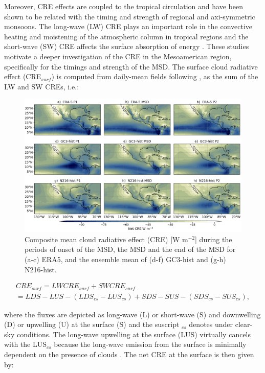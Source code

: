 Moreover,  CRE effects are coupled to the tropical circulation \citep{bony2004dynamic,webb2017} and have been shown to be related with the timing and strength of regional \citep{guo2015} and axi-symmetric \citep{byrne2020} monsoons. The long-wave (LW) CRE plays an important role in the convective heating and moistening of the atmospheric column in tropical regions and the short-wave (SW) CRE affects the surface absorption of energy \citep{allan2011}. 
These studies motivate a deeper investigation of the CRE in the Mesoamerican region, specifically for the timings and strength of the MSD. The surface cloud radiative effect (CRE$_{surf}$) is computed from daily-mean fields following \cite{allan2011}, as the sum of the LW and SW CREs, i.e.:


\begin{figure}[b!]
\includegraphics[width=\linewidth]{figures/fig4_creclim_3.png}
\caption[Composites of cloud radiative effects]{Composite mean cloud radiative effect (CRE) [W m$^{-2}$] during the periods of onset of the MSD, the MSD and the end of the MSD for (a-c) ERA5, and the ensemble mean of (d-f) GC3-hist and (g-h) N216-hist.}
\label{fig:cre_comp}
\end{figure}

\begin{multline}
CRE_{surf}=LW CRE_{surf} +SW CRE_{surf} \\ = LDS-LUS -(LDS_{cs}-LUS_{cs})+SDS-SUS-(SDS_{cs}-SUS_{cs}),
\end{multline}

\noindent where the fluxes are depicted as long-wave (L) or short-wave (S) and downwelling (D) or upwelling (U) at the surface (S) and the suscript $_{cs}$ denotes under clear-sky conditions. The long-wave upwelling at the surface (LUS) virtually cancels with the LUS$_{cs}$ because the long-wave emission from the surface is minimally dependent on the presence of clouds \citep{allan2011}. The net CRE at the surface is then given by:


